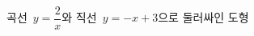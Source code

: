 \hspace*{2mm}\begin{minipage}[t]{\dimexpr\linewidth-2mm\relax}\vspace{0pt}
곡선~$y=\dfrac{2}{x}$와 직선~$y=-x+3$으로 둘러싸인 도형\end{minipage}
